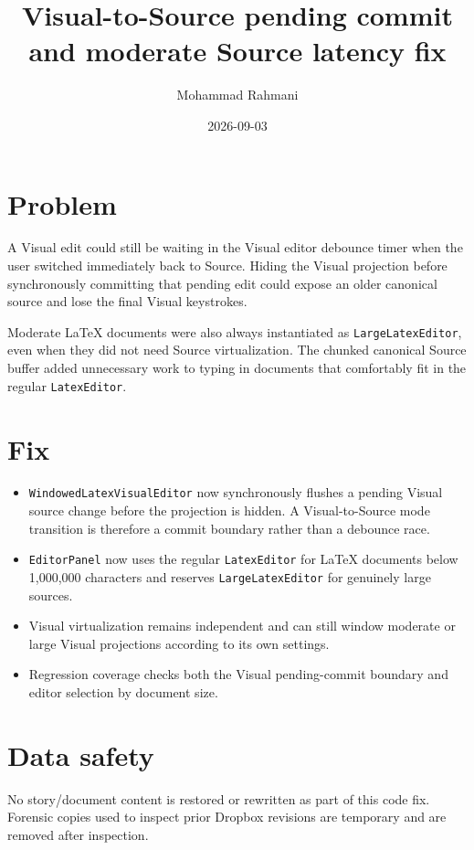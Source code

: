 \documentclass[a4paper]{article}
\title{Visual-to-Source pending commit and moderate Source latency fix}
\date{2026-09-03}
\author{Mohammad Rahmani}
\begin{document}
   \maketitle

   \section{Problem}

   A Visual edit could still be waiting in the Visual editor debounce timer when the user switched immediately back to Source. Hiding the Visual projection before synchronously committing that pending edit could expose an older canonical source and lose the final Visual keystrokes.

   Moderate LaTeX documents were also always instantiated as \texttt{LargeLatexEditor}, even when they did not need Source virtualization. The chunked canonical Source buffer added unnecessary work to typing in documents that comfortably fit in the regular \texttt{LatexEditor}.

   \section{Fix}

   \begin{itemize}
      \item \texttt{WindowedLatexVisualEditor} now synchronously flushes a pending Visual source change before the projection is hidden. A Visual-to-Source mode transition is therefore a commit boundary rather than a debounce race.
      \item \texttt{EditorPanel} now uses the regular \texttt{LatexEditor} for LaTeX documents below 1,000,000 characters and reserves \texttt{LargeLatexEditor} for genuinely large sources.
      \item Visual virtualization remains independent and can still window moderate or large Visual projections according to its own settings.
      \item Regression coverage checks both the Visual pending-commit boundary and editor selection by document size.
   \end{itemize}

   \section{Data safety}

   No story/document content is restored or rewritten as part of this code fix. Forensic copies used to inspect prior Dropbox revisions are temporary and are removed after inspection.

   
   
\end{document}
